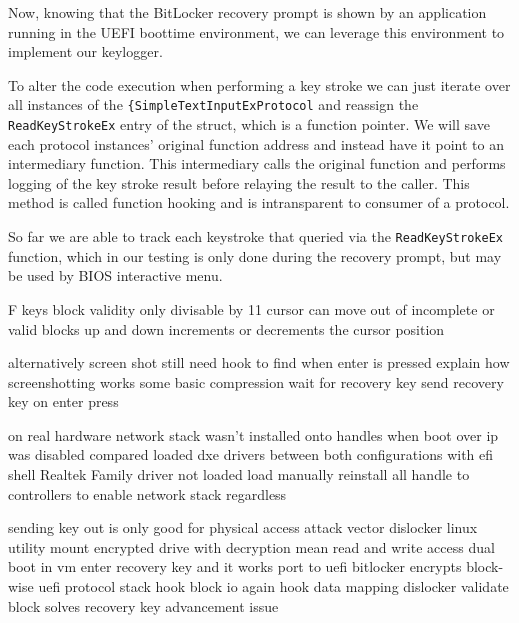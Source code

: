 Now, knowing that the BitLocker recovery prompt is shown by an application running in the UEFI boottime environment, we can leverage this environment to implement our keylogger.

To alter the code execution when performing a key stroke we can just iterate over all instances of the \lstinline{{SimpleTextInputExProtocol} and reassign the \lstinline{ReadKeyStrokeEx} entry of the struct, which is a function pointer. We will save each protocol instances' original function address and instead have it point to an intermediary function. This intermediary calls the original function and performs logging of the key stroke result before relaying the result to the caller. This method is called function hooking and is intransparent to consumer of a protocol.



So far we are able to track each keystroke that queried via the \lstinline{ReadKeyStrokeEx} function, which in our testing is only done during the recovery prompt, but may be used by BIOS interactive menu.

F keys
block validity
only divisable by 11
cursor can move out of incomplete or valid blocks
up and down increments or decrements the cursor position

alternatively screen shot
still need hook to find when enter is pressed
explain how screenshotting works
some basic compression
wait for recovery key
send recovery key on enter press

on real hardware
network stack wasn't installed onto handles when boot over ip was disabled
compared loaded dxe drivers between both configurations with efi shell
Realtek Family driver not loaded
load manually
reinstall all handle to controllers to enable network stack regardless

sending key out is only good for physical access attack vector
dislocker linux utility
\cite{dislocker}
mount encrypted drive with decryption mean
read and write access
dual boot in vm
enter recovery key and it works
port to uefi
bitlocker encrypts block-wise
uefi protocol stack
hook block io
again hook data mapping
dislocker validate block
solves recovery key advancement issue

